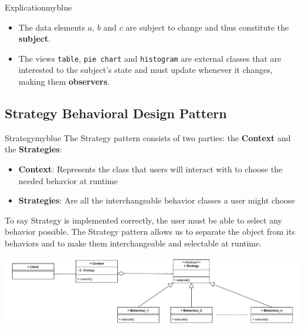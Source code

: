\vspace{0.5cm}

\begin{prettyBox}{Explication}{myblue}
    \begin{itemize}
        \item The data elements \(a\), \(b\) and \(c\) are subject to change and thus constitute the \textbf{subject}. 
        \item The views \texttt{table}, \texttt{pie chart} and \texttt{histogram} are external classes that are interested to the subject’s state 
    and must update whenever it changes, making them \textbf{observers}.
    \end{itemize}
\end{prettyBox}


\newpage

\subsection{Strategy Behavioral Design Pattern}
\begin{prettyBox}{Strategy}{myblue}
The Strategy pattern consists of two parties: the \textbf{Context} and the \textbf{Strategies}:
\begin{itemize}
\item \textbf{Context}: Represents the class that users will interact with to choose the needed behavior at runtime
\item \textbf{Strategies}: Are all the interchangeable behavior classes a user might choose
\end{itemize}
To say Strategy is implemented correctly, the user must be able to select any behavior possible. The Strategy pattern allows us to separate the object from its behaviors and to make them interchangeable and selectable at runtime.
\end{prettyBox}

\vspace{1cm}


\begin{center}
\includegraphics[height=0.15\textheight]{Chapters/DesignPattern/Strategy/str1.drawio.pdf}
\end{center}

